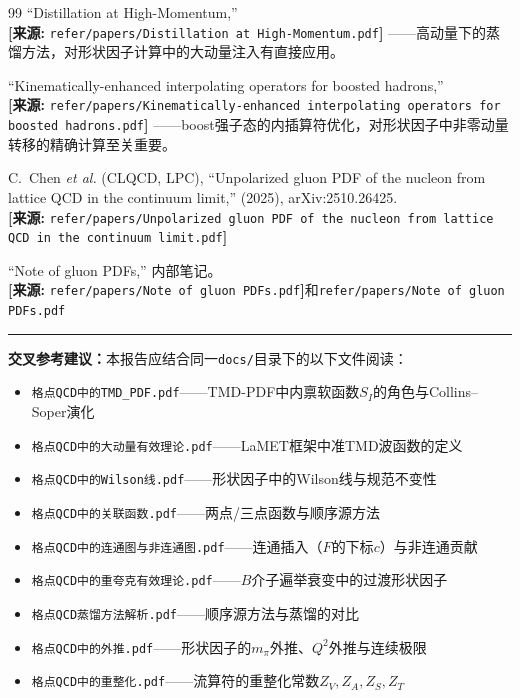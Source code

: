 \documentclass[12pt,a4paper]{ctexart}
\theoremstyle{definition}
\begin{document}
\begin{thebibliography}{99}
``Distillation at High-Momentum,''
\\\textbf{[来源:} \texttt{refer/papers/Distillation at High-Momentum.pdf}\textbf{]}
——高动量下的蒸馏方法，对形状因子计算中的大动量注入有直接应用。

``Kinematically-enhanced interpolating operators for boosted hadrons,''
\\\textbf{[来源:} \texttt{refer/papers/Kinematically-enhanced interpolating operators for boosted hadrons.pdf}\textbf{]}
——boost强子态的内插算符优化，对形状因子中非零动量转移的精确计算至关重要。

C.~Chen \textit{et al.} (CLQCD, LPC),
``Unpolarized gluon PDF of the nucleon from lattice QCD in the continuum limit,''
(2025), arXiv:2510.26425.
\\\textbf{[来源:} \texttt{refer/papers/Unpolarized gluon PDF of the nucleon from lattice QCD in the continuum limit.pdf}\textbf{]}

``Note of gluon PDFs,'' 内部笔记。
\\\textbf{[来源:} \texttt{refer/papers/Note of gluon PDFs.pdf}\textbf{]}和\texttt{refer/papers/Note of gluon PDFs.pdf}

\end{thebibliography}

\vspace{0.5cm}
\noindent\rule{\textwidth}{0.5pt}
\small
\textbf{交叉参考建议：}本报告应结合同一\texttt{docs/}目录下的以下文件阅读：
\begin{itemize}[nosep]
    \item \texttt{格点QCD中的TMD\_PDF.pdf}——TMD-PDF中内禀软函数$S_I$的角色与Collins--Soper演化
    \item \texttt{格点QCD中的大动量有效理论.pdf}——LaMET框架中准TMD波函数的定义
    \item \texttt{格点QCD中的Wilson线.pdf}——形状因子中的Wilson线与规范不变性
    \item \texttt{格点QCD中的关联函数.pdf}——两点/三点函数与顺序源方法
    \item \texttt{格点QCD中的连通图与非连通图.pdf}——连通插入（$F$的下标$c$）与非连通贡献
    \item \texttt{格点QCD中的重夸克有效理论.pdf}——$B$介子遍举衰变中的过渡形状因子
    \item \texttt{格点QCD蒸馏方法解析.pdf}——顺序源方法与蒸馏的对比
    \item \texttt{格点QCD中的外推.pdf}——形状因子的$m_\pi$外推、$Q^2$外推与连续极限
    \item \texttt{格点QCD中的重整化.pdf}——流算符的重整化常数$Z_V, Z_A, Z_S, Z_T$
\end{itemize}
\end{document}
